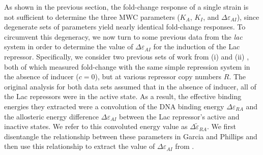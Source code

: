\documentclass[12pt]{caltech_thesis}
\begin{document}
As shown in the previous section, the fold-change response of a single
strain is not sufficient to determine the three MWC parameters (\(K_A\),
\(K_I\), and \(\Delta\varepsilon_{AI}\)), since degenerate sets of
parameters yield nearly identical fold-change responses. To circumvent
this degeneracy, we now turn to some previous data from the \emph{lac}
system in order to determine the value of \(\Delta\varepsilon_{AI}\) for
the induction of the Lac repressor. Specifically, we consider two
previous sets of work from (i) \textcite{garcia2011} and (ii)
\textcite{brewster2014}, both of which measured fold-change with the
same simple repression system in the absence of inducer (\(c=0\)), but
at various repressor copy numbers \(R\). The original analysis for both
data sets assumed that in the absence of inducer, all of the Lac
repressors were in the active state. As a result, the effective binding
energies they extracted were a convolution of the DNA binding energy
\(\Delta\varepsilon_{RA}\) and the allosteric energy difference
\(\Delta\varepsilon_{AI}\) between the Lac repressor's active and
inactive states. We refer to this convoluted energy value as
\(\Delta \tilde{\varepsilon}_{RA}\). We first disentangle the
relationship between these parameters in Garcia and Phillips and then
use this relationship to extract the value of \(\Delta\varepsilon_{AI}\)
from \textcite{brewster2014}.
\end{document}
